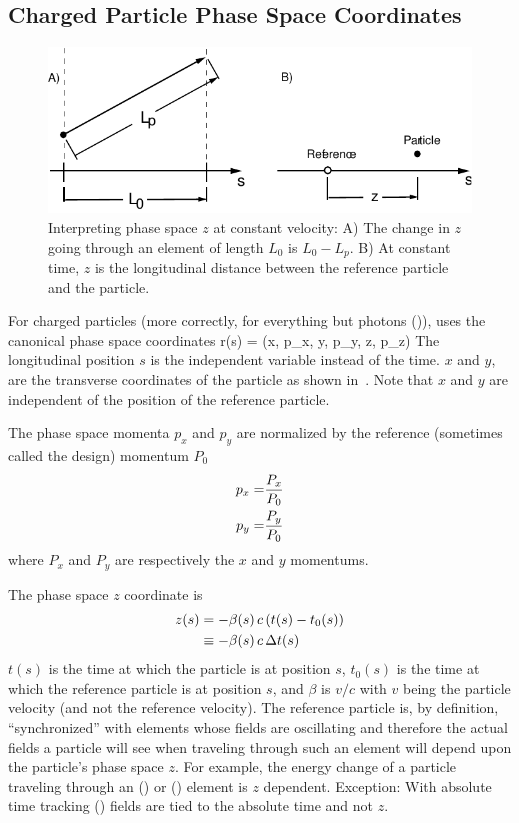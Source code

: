 \subsection{Charged Particle Phase Space Coordinates}
\label{s:phase.space}

\begin{figure}
\centering 
\includegraphics{canonical-z.pdf} 
\caption[Interpreting phase space $z$ at constant velocity.]
{Interpreting phase space $z$ at constant velocity: A) The change in $z$
going through an element of length $L_0$ is $L_0 - L_p$.  B) At
constant time, $z$ is the longitudinal distance between the reference
particle and the particle.}
\label{f:canonical.z}
\end{figure}

For charged particles (more correctly, for everything but photons
()), \bmad uses the canonical phase space
coordinates
\Begineq
  \Bf r(s) = (x, p_x, y, p_y, z, p_z)
\Endeq
The longitudinal position $s$ is the independent variable instead of
the time. $x$ and $y$, are the transverse coordinates of the particle
as shown in~. Note that $x$ and $y$ are independent
of the position of the reference particle.

The phase space momenta $p_x$ and $p_y$ are normalized by the
reference (sometimes called the design) momentum $P_0$
\begin{align}
  p_x = &\frac{P_x}{P_0} \nonumber \\
  p_y = &\frac{P_y}{P_0}
  \label{ppp}
\end{align}
where $P_x$ and $P_y$ are respectively the $x$ and $y$ momentums.

The phase space $z$ coordinate is 
\begin{align}
  z(s) &= -\beta(s) \, c \, (t(s) - t_0(s)) \nonumber \\
    &\equiv - \beta(s) \, c \, \Delta t(s)
  \label{zbctt}
\end{align}
$t(s)$ is the time at which the particle is at position $s$, $t_0(s)$
is the time at which the reference particle is at position $s$, and
$\beta$ is $v/c$ with $v$ being the particle velocity (and not the
reference velocity). The reference particle is, by definition,
``synchronized'' with elements whose fields are oscillating and
therefore the actual fields a particle will see when traveling through
such an element will depend upon the particle's phase space $z$. For
example, the energy change of a particle traveling through an
 () or  () element
is $z$ dependent. Exception: With absolute time tracking
() fields are tied to the absolute time and not $z$.

